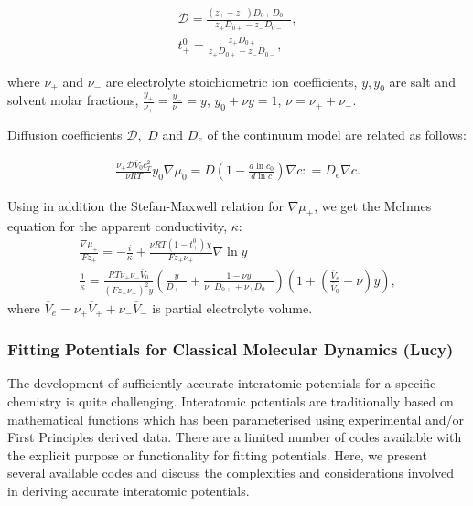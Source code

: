 \documentclass[../main.tex]{subfiles}
\begin{document}
\begin{equation} \begin{array}{l}
    \displaystyle \mathcal{D} = \frac{\left( z_+ - z_- \right) D_{0 +}  D_{0 -} }{z_+ D_{0 +} - z_- D_{0 -}},
    \\
     \displaystyle t_+^0 = \frac{ z_+ D_{0 +}  }{z_+ D_{0 +} - z_- D_{0 -}},
    \label{cp diff_def}
\end{array} \end{equation}

\noindent where  $\nu_+$ and $\nu_-$ are electrolyte stoichiometric ion coefficients, $y, y_0$ are salt and solvent molar fractions,  $\frac{y_+}{\nu_+}= \frac{y_-}{\nu_-} =y$, $y_0 + \nu y =1$, $\nu = \nu_+ + \nu_-.$

Diffusion coefficients $\mathcal{D},$ $D$ and $D_e$ of the continuum model are related as follows:

\begin{equation} \begin{array}{l}
    \displaystyle  \frac{\nu_+ \mathcal{D} \overline{V}_0 c_T^2 }{\nu R T} y_0 \nabla \mu_0 = D \left( 1-\frac{d \ln c_0 }{d\ln c}\right) \nabla c : = D_e \nabla c .
    \label{eqDDD}
\end{array} \end{equation}

Using in addition the Stefan-Maxwell relation for $\nabla \mu_+$, we get the McInnes equation for the apparent conductivity, $\kappa$:
\begin{equation} \begin{array}{l}
    \displaystyle \frac{\nabla \mu_+}{F z_+} = - \frac{i}{\kappa} + \frac{\nu R T \left( 1-t_+^0 \right) \chi }{F z_+ \nu_+ } \nabla \ln y
    \\
     \displaystyle \frac{1}{\kappa} = \frac{ R T \nu_+ \nu_- \overline{V}_0}{\left( F z_+ \nu_+\right)^2 y}\left( \frac{y}{D_{+-} } +  \frac{1 - \nu y }{\nu_- D_{0+} + \nu_+ D_{0-}} \right) \left( 1+ \left( \frac{\overline{V}_e}{\overline{V}_0 } - \nu \right) y \right),
    \label{mcinn}
\end{array} \end{equation}
where $\overline{V}_e = \nu_+ \overline{V}_+  + \nu_- \overline{V}_-$ is partial electrolyte volume.






\subsubsection{Fitting Potentials for Classical Molecular Dynamics (Lucy)}
\label{sec:potential_fitting}
The development of sufficiently accurate interatomic potentials for a specific chemistry is quite challenging. Interatomic potentials are traditionally based on mathematical functions which has been parameterised using experimental and/or First Principles derived data. \cite{jones_1924, buckingham_classical_1938} There are a limited number of codes available with the explicit purpose or functionality for fitting potentials. Here, we present several available codes and discuss the complexities and considerations involved in deriving accurate interatomic potentials.
\end{document}

